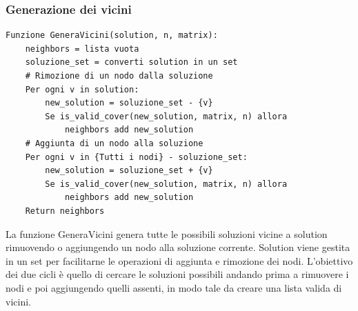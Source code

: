 \documentclass[12pt,a4paper,twoside]{article}
\begin{document}
\subsubsection{Generazione dei vicini}
\begin{verbatim}
Funzione GeneraVicini(solution, n, matrix):
    neighbors = lista vuota
    soluzione_set = converti solution in un set
    # Rimozione di un nodo dalla soluzione
    Per ogni v in solution:
        new_solution = soluzione_set - {v}
        Se is_valid_cover(new_solution, matrix, n) allora
            neighbors add new_solution
    # Aggiunta di un nodo alla soluzione
    Per ogni v in {Tutti i nodi} - soluzione_set:
        new_solution = soluzione_set + {v}
        Se is_valid_cover(new_solution, matrix, n) allora
            neighbors add new_solution
    Return neighbors
\end{verbatim}
La funzione GeneraVicini genera tutte le possibili soluzioni vicine a solution rimuovendo o aggiungendo un nodo alla soluzione corrente. Solution viene gestita in un set per facilitarne le operazioni di aggiunta e rimozione dei nodi. L'obiettivo dei due cicli è quello di cercare le soluzioni possibili andando prima a rimuovere i nodi e poi aggiungendo quelli assenti, in modo tale da creare una lista valida di vicini.
\end{document}
